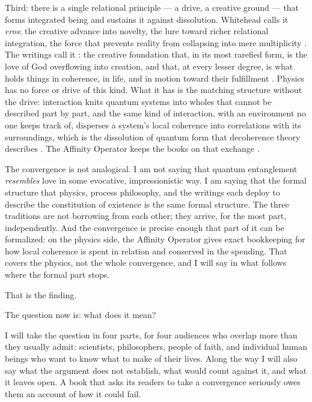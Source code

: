 Third: there is a single relational principle --- a drive, a creative
ground --- that forms integrated being and sustains it against dissolution.
Whitehead calls it \emph{eros}: the
creative advance into novelty, the lure toward richer relational integration,
the force that prevents reality from collapsing into mere multiplicity
\citep{Whitehead1933}.  The \bahai writings call it \mahabbat: the creative
foundation that, in its most rarefied form, is the love of God overflowing
into creation, and that, at every lesser degree, is what holds things in
coherence, in life, and in motion toward their fulfillment \citep{PUP,SummonsLordHosts}.
Physics has no force or drive of this kind.  What it has is the matching
structure without the drive:
interaction knits quantum systems into wholes that cannot be described part by
part, and the same kind of interaction, with an environment no one keeps track
of, disperses a system's local coherence into correlations with its
surroundings, which is the dissolution of quantum form that decoherence theory
describes \citep{Zurek2003}.  The Affinity Operator keeps the books on that
exchange \citep{AdamsRCT}.

The convergence is not analogical.  I am not saying that quantum entanglement
\emph{resembles} love in some evocative, impressionistic way.  I am saying
that the formal structure that physics, process philosophy, and the \bahai
writings each deploy to describe the constitution of existence is the same
formal structure.  The three traditions are not borrowing from each other;
they arrive, for the most part, independently.  And the convergence is precise
enough that part of it can be formalized: on the physics side, the Affinity
Operator gives exact bookkeeping for how local coherence is spent in relation
and conserved in the spending.  That covers the physics, not the whole
convergence, and I will say in what follows where the formal part stops.

That is the finding.

The question now is: what does it mean?

I will take the question in four parts, for four audiences who overlap more
than they usually admit: scientists, philosophers, people of faith, and
individual human beings who want to know what to make of their lives.  Along
the way I will also say what the argument does not establish, what would count
against it, and what it leaves open.  A book that asks its readers to take a
convergence seriously owes them an account of how it could fail.


